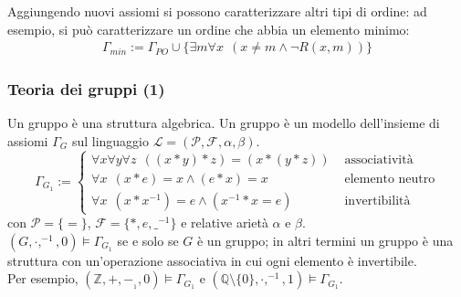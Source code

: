 Aggiungendo nuovi assiomi si possono caratterizzare altri tipi di ordine: ad esempio, si può caratterizzare un ordine che abbia un elemento minimo:
\begin{align*}
  \Gamma_{min} := \Gamma_{PO} \cup \{\exists m \forall x ~~ (x \neq m \land \neg R(x,m))\}
\end{align*}

\subsubsection{Teoria dei gruppi (1)}
Un gruppo è una struttura algebrica. 
Un gruppo è un modello dell'insieme di assiomi $\Gamma_G$ sul linguaggio $\mathscr{L} = (\mathscr{P}, \mathscr{F}, \alpha, \beta)$. 
$$
\Gamma_{G_1} := 
  \begin{cases}
    \forall x \forall y \forall z  ~~ ((x * y)*z) = (x*(y*z))  & \text{ associatività}\\
    \forall x ~~ (x * e) = x \land (e * x) = x  & \text{ elemento neutro}\\
    \forall x ~~ (x * x^{-1}) = e \land (x^{-1} * x = e) & \text{ invertibilità}
  \end{cases}
$$
con $\mathscr{P} = \{ = \}$, $\mathscr{F} = \{*, e, \_^{-1}\}$ e relative arietà $\alpha$ e $\beta$. \\
$(G, \cdot, ^{-1}, 0) \models \Gamma_{G_1}$ se e solo se $G$ è un gruppo; in altri termini un gruppo è una struttura con un'operazione associativa in cui ogni elemento è invertibile. \\
Per esempio, $(\mathbb{Z}, +, -_{_1}, 0) \models \Gamma_{G_1}$ e $(\mathbb{Q}\setminus{\{0\}}, \cdot, ^{-1}, 1) \models \Gamma_{G_1}$. 

